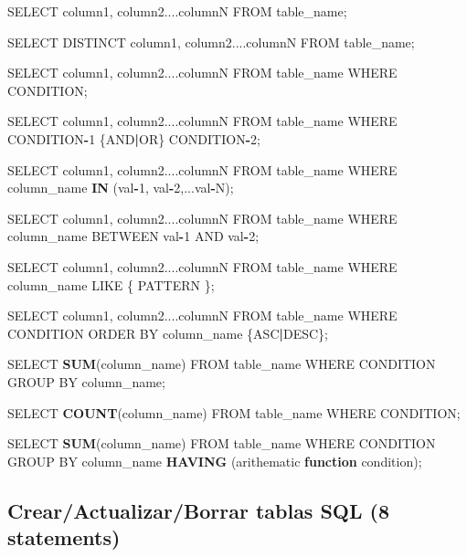 \documentclass[]{book}
\newenvironment{Shaded}{\begin{snugshade}}{\end{snugshade}}
\newcommand{\KeywordTok}[1]{\textcolor[rgb]{0.13,0.29,0.53}{\textbf{#1}}}
\newcommand{\DecValTok}[1]{\textcolor[rgb]{0.00,0.00,0.81}{#1}}
\newcommand{\ControlFlowTok}[1]{\textcolor[rgb]{0.13,0.29,0.53}{\textbf{#1}}}
\newcommand{\OperatorTok}[1]{\textcolor[rgb]{0.81,0.36,0.00}{\textbf{#1}}}
\newcommand{\NormalTok}[1]{#1}
\begin{document}
\begin{Shaded}
\begin{Highlighting}[]
\NormalTok{SELECT column1, column2....columnN}
\NormalTok{FROM   table_name;}

\NormalTok{SELECT DISTINCT column1, column2....columnN}
\NormalTok{FROM   table_name;}

\NormalTok{SELECT column1, column2....columnN}
\NormalTok{FROM   table_name}
\NormalTok{WHERE  CONDITION;}

\NormalTok{SELECT column1, column2....columnN}
\NormalTok{FROM   table_name}
\NormalTok{WHERE  CONDITION}\OperatorTok{-}\DecValTok{1}\NormalTok{ \{AND}\OperatorTok{|}\NormalTok{OR\} CONDITION}\OperatorTok{-}\DecValTok{2}\NormalTok{;}

\NormalTok{SELECT column1, column2....columnN}
\NormalTok{FROM   table_name}
\NormalTok{WHERE  column_name }\KeywordTok{IN}\NormalTok{ (val}\OperatorTok{-}\DecValTok{1}\NormalTok{, val}\OperatorTok{-}\DecValTok{2}\NormalTok{,...val}\OperatorTok{-}\NormalTok{N);}

\NormalTok{SELECT column1, column2....columnN}
\NormalTok{FROM   table_name}
\NormalTok{WHERE  column_name BETWEEN val}\OperatorTok{-}\DecValTok{1}\NormalTok{ AND val}\OperatorTok{-}\DecValTok{2}\NormalTok{;}

\NormalTok{SELECT column1, column2....columnN}
\NormalTok{FROM   table_name}
\NormalTok{WHERE  column_name LIKE \{ PATTERN \};}

\NormalTok{SELECT column1, column2....columnN}
\NormalTok{FROM   table_name}
\NormalTok{WHERE  CONDITION}
\NormalTok{ORDER BY column_name \{ASC}\OperatorTok{|}\NormalTok{DESC\};}

\NormalTok{SELECT }\KeywordTok{SUM}\NormalTok{(column_name)}
\NormalTok{FROM   table_name}
\NormalTok{WHERE  CONDITION}
\NormalTok{GROUP BY column_name;}

\NormalTok{SELECT }\KeywordTok{COUNT}\NormalTok{(column_name)}
\NormalTok{FROM   table_name}
\NormalTok{WHERE  CONDITION;}

\NormalTok{SELECT }\KeywordTok{SUM}\NormalTok{(column_name)}
\NormalTok{FROM   table_name}
\NormalTok{WHERE  CONDITION}
\NormalTok{GROUP BY column_name}
\KeywordTok{HAVING}\NormalTok{ (arithematic }\ControlFlowTok{function}\NormalTok{ condition);}
\end{Highlighting}
\end{Shaded}

\subsection{Crear/Actualizar/Borrar tablas SQL (8
statements)}\label{crearactualizarborrar-tablas-sql-8-statements}
\end{document}
